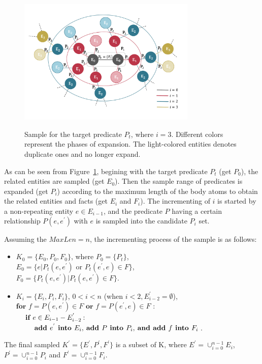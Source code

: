 \documentclass{article}
\begin{document}
	\begin{figure}
		\centering
		\includegraphics[width=85mm]{sample.pdf}\\
		\caption{Sample for the target predicate $P_t$, where $i =3$. Different colors represent the phases of expansion. The light-colored entities denotes duplicate ones and no longer expand. }
		\label{fig:sample}
	\end{figure}
	
	As can be seen from Figure~\ref{fig:sample}, begining with the target predicate $P_t$ (get $P_0$), the related entities are sampled (get $E_0$). Then the sample range of predicates is expanded (get $P_i$) according to the maximum length of the body atoms to obtain the related entities and facts (get $E_i$ and $F_i$). The incrementing of $i$ is started by a non-repeating entity $e \in E_{i-1}$, and the predicate $P$ having a certain relationship $P(e, e^{'})$ with $e$ is sampled into the candidate $P_i$ set. 
	
	Assuming the $MaxLen = n$, the incrementing process of the sample is as follows:
	\begin{itemize}
		\item $K_0=\{E_0, P_0, F_0\}$, where $P_0=\{P_t\}$, \\
		$E_0=\{e | P_t(e, e^{'})$ or $P_t(e^{'}, e) \in F\}$, \\
		$F_0=\{P_t(e,e^{'}) | P_t(e,e^{'}) \in F \}$.
		\item $K_i=\{E_i, P_i, F_i\}$, $0<i<n$ (when $i<2, E^{'}_{i-2} = \emptyset$),\\
		$\textbf{for }f=P(e,e^{'}) \in F \textbf{ or } f=P(e^{'},e) \in F$ :\\
		$\textbf{\quad if } e \in E_{i-1}-E^{'}_{i-2}$: \\
		$\textbf{\qquad add } e^{'}\textbf{ into }E_i\text{,}\textbf{ add }P\textbf{ into }P_i\text{,}\textbf{ and add }f\textbf{ into }F_i$.
	\end{itemize}
	The final sampled $K^{'} = \{E^{'}, P^{'}, F^{'}\}$ is a subset of K, where $E^{'}=\cup^{n-1}_{i=0}E_i$, $P^{'}=\cup^{n-1}_{i=0}P_i$ and $F^{'}=\cup^{n-1}_{i=0}F_i$.
	
\end{document}
